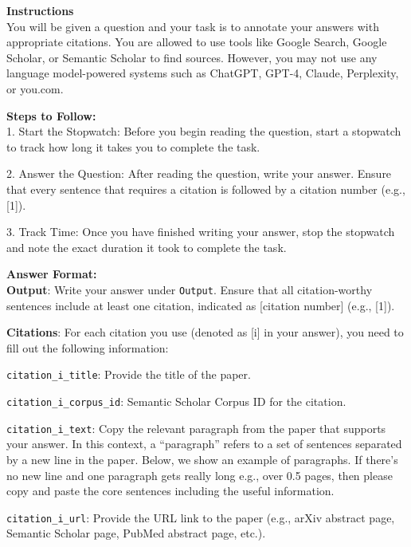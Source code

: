 \begin{table}[h!]
\begin{tcolorbox}
{\bf Instructions}\\ 
You will be given a question and your task is to annotate your answers with appropriate citations. You are allowed to use tools like Google Search, Google Scholar, or Semantic Scholar to find sources. However, you may not use any language model-powered systems such as ChatGPT, GPT-4, Claude, Perplexity, or you.com.

{\bf Steps to Follow:}\\
1. Start the Stopwatch: Before you begin reading the question, start a stopwatch to track how long it takes you to complete the task.


2. Answer the Question: After reading the question, write your answer. Ensure that every sentence that requires a citation is followed by a citation number (e.g., [1]).


3. Track Time: Once you have finished writing your answer, stop the stopwatch and note the exact duration it took to complete the task.


{\bf Answer Format:}\\
{\bf Output}: Write your answer under \texttt{Output}. Ensure that all citation-worthy sentences include at least one citation, indicated as [citation number] (e.g., [1]).

{\bf Citations}: For each citation you use (denoted as [i] in your answer), you need to fill out the following information:

\texttt{citation\_i\_title}:  
Provide the title of the paper.

\texttt{citation\_i\_corpus\_id}: Semantic Scholar Corpus ID for the citation.   

\texttt{citation\_i\_text}: Copy the relevant paragraph from the paper that supports your answer. In this context, a ``paragraph'' refers to a set of sentences separated by a new line in the paper. Below, we show an example of paragraphs. If there’s no new line and one paragraph gets really long e.g., over 0.5 pages, then please copy and paste the core sentences including the useful information.

\texttt{citation\_i\_url}: Provide the URL link to the paper (e.g., arXiv abstract page, Semantic Scholar page, PubMed abstract page, etc.).
\end{tcolorbox}
\caption{\label{tab:answer_annotation_instructions} {\bf \textsc{ScholarQAMulti} annotation instructions}: Instructions given to our expert annotators to annotate question and answers. }
\end{table}



